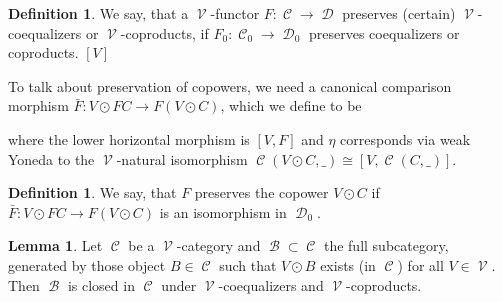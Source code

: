 \documentclass[a4paper,11pt,oneside,openany]{scrbook}
\newcommand{\from}{\colon}
\newcommand{\iso}{\cong}
\DeclareMathOperator{\V}{\mathcal{V}}
\DeclareMathOperator{\B}{\mathcal{B}}
\DeclareMathOperator{\C}{\mathcal{C}}
\DeclareMathOperator{\D}{\mathcal{D}}
\DeclareMathOperator{\copw}{\odot}
\theoremstyle{definition}
\theoremstyle{definition}
\newtheorem{defn}[thm]{Definition} %
\newtheorem{lemma}[thm]{Lemma}
\begin{document}
\begin{defn}
   We say, that a $\V$-functor $F \from \C \to \D$ preserves (certain) $\V$-coequalizers or $\V$-coproducts, if $F_{0} \from \C_{0} \to \D_{0}$ preserves
   coequalizers or coproducts. $[V]$
\end{defn}

To talk about preservation of copowers, we need a canonical comparison morphism $\bar{F} \from V\copw FC \to F(V\copw C)$, which we define to be 
   \begin{center}
   \end{center}
where the lower horizontal morphism is $[V,F]$ and $\eta$ corresponds via weak Yoneda to the $\V$-natural isomorphism $\C(V\copw C,\_) \iso [V,\C(C,\_)]$.

\begin{defn}
   We say, that $F$ preserves the copower $V \copw C$ if $\bar{F} \from V \copw FC \to F(V \copw C)$ is an isomorphism in $\D_{0}$.
\end{defn}

\begin{lemma}
   Let $\C$ be a $\V$-category and $\B \subset \C$ the full subcategory, generated by those object $B \in \C$ such that $V \copw B$ exists (in $\C$) for all
   $V \in \V$. Then $\B$ is closed in $\C$ under $\V$-coequalizers and $\V$-coproducts.
\end{lemma}
\end{document}
